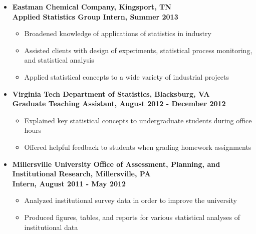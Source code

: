\documentclass[10pt]{article}
\begin{document}
\begin{itemize}
\item[] \textbf{Eastman Chemical Company, Kingsport, TN\\
Applied Statistics Group Intern, Summer 2013}
\begin{itemize}
\item Broadened knowledge of applications of statistics in industry
\item Assisted clients with design of experiments, statistical process monitoring, and statistical analysis
\item Applied statistical concepts to a wide variety of industrial projects
\end{itemize} 


\item[] \textbf{Virginia Tech Department of Statistics, Blacksburg, VA\\
Graduate Teaching Assistant, August 2012 - December 2012}
\begin{itemize}
\item Explained key statistical concepts to undergraduate students during office hours
\item Offered helpful feedback to students when grading homework assignments
\end{itemize}

\item[] \textbf{Millersville University Office of Assessment, Planning, and Institutional Research, Millersville, PA \\
Intern, August 2011 - May 2012}
\begin{itemize}
\item Analyzed institutional survey data in order to improve the university
\item Produced figures, tables, and reports for various statistical analyses of institutional data
\end{itemize}


%
%
\end{itemize}
\end{document}
